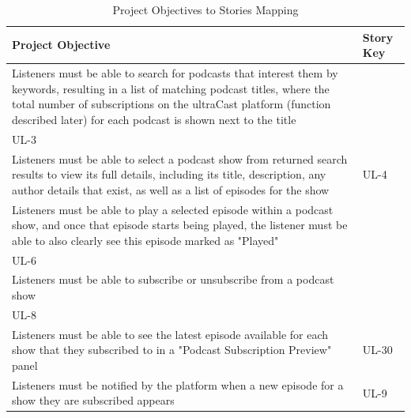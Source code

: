 \documentclass[12pt]{article}
\begin{document}
\begin{table}
    \centering
    \caption{Project Objectives to Stories Mapping}
    \label{table:project_objectives_to_stories}
    \bigskip
    \begin{tabularx}{\linewidth}{|>{\hsize=1.8\hsize}X|>{\hsize=0.2\hsize}X|}
        \hline
        \textbf{Project Objective}                                             & \textbf{Story Key} \\
        \hline
        Listeners must be able to search for podcasts that interest them by keywords, resulting in a list of matching podcast titles, where the total number of subscriptions on the ultraCast platform (function described later) for each podcast is shown next to the title                                             & \begin{tabular}[c]{@{}l@{}}UL-2\\ UL-3\end{tabular}          \\ \hline
        Listeners must be able to select a podcast show from returned search results to view its full details, including its title, description, any author details that exist, as well as a list of episodes for the show                                             & UL-4                               \\ \hline
        Listeners must be able to play a selected episode within a podcast show, and once that episode starts being played, the listener must be able to also clearly see this episode marked as "Played"                                             & \begin{tabular}[c]{@{}l@{}}UL-5\\ UL-6\end{tabular}          \\ \hline
        Listeners must be able to subscribe or unsubscribe from a podcast show & \begin{tabular}[c]{@{}l@{}}UL-7\\ UL-8\end{tabular}         \\ \hline
        Listeners must be able to see the latest episode available for each show that they subscribed to in a "Podcast Subscription Preview" panel                                            & UL-30                              \\ \hline
        Listeners must be notified by the platform when a new episode for a show  they are subscribed appears                                             & UL-9                               \\ \hline

\end{tabularx}
\end{table}
\end{document}
